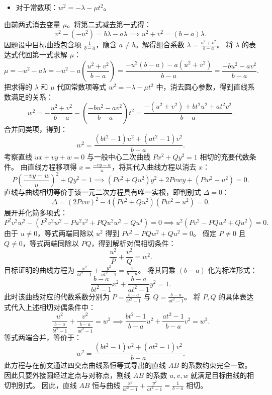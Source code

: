 \begin{solution}
\begin{itemize}
\item 对于常数项：$w^2 = -\lambda - \mu t^2$。
\end{itemize}
由前两式消去变量 $\mu$。将第二式减去第一式得：
\[ v^2 - (-u^2) = b\lambda - a\lambda \implies u^2 + v^2 = (b - a)\lambda. \]
因题设中目标曲线包含项 $\frac{1}{b-a}$，隐含 $a \neq b$。解得组合系数 $\lambda = \frac{u^2 + v^2}{b - a}$。
将 $\lambda$ 的表达式代回第一式求解 $\mu$：
\[ \mu = -u^2 - a\lambda = -u^2 - a\left(\frac{u^2 + v^2}{b - a}\right) = \frac{-u^2(b - a) - a(u^2 + v^2)}{b - a} = \frac{-bu^2 - av^2}{b - a}. \]
把求得的 $\lambda$ 和 $\mu$ 代回常数项等式 $w^2 = -\lambda - \mu t^2$ 中，消去圆心参数，得到直线系数满足的关系：
\[ w^2 = -\frac{u^2 + v^2}{b - a} - \left(\frac{-bu^2 - av^2}{b - a}\right) t^2 = \frac{-(u^2 + v^2) + bt^2 u^2 + at^2 v^2}{b - a}. \]
合并同类项，得到：
\[ w^2 = \frac{(bt^2 - 1)u^2 + (at^2 - 1)v^2}{b - a}. \]
考察直线 $ux + vy + w = 0$ 与一般中心二次曲线 $Px^2 + Qy^2 = 1$ 相切的充要代数条件。
由直线方程移项得 $x = \frac{-vy - w}{u}$，将其代入曲线方程以消去 $x$：
\[ P\left(\frac{-vy - w}{u}\right)^2 + Qy^2 = 1 \implies (Pv^2 + Qu^2)y^2 + 2Pvwy + (Pw^2 - u^2) = 0. \]
直线与曲线相切等价于该一元二次方程具有唯一实根，即判别式 $\Delta = 0$：
\[ \Delta = (2Pvw)^2 - 4(Pv^2 + Qu^2)(Pw^2 - u^2) = 0. \]
展开并化简多项式：
\[ P^2v^2w^2 - (P^2v^2w^2 - Pu^2v^2 + PQu^2w^2 - Qu^4) = 0 \implies u^2(Pv^2 - PQw^2 + Qu^2) = 0. \]
由于 $u \neq 0$，等式两端同除以 $u^2$ 得到 $Pv^2 - PQw^2 + Qu^2 = 0$。
假定 $P \neq 0$ 且 $Q \neq 0$，等式两端同除以 $PQ$，得到解析对偶相切条件：
\[ \frac{u^2}{P} + \frac{v^2}{Q} = w^2. \]
目标证明的曲线方程为 $\frac{x^2}{bt^2 - 1} + \frac{y^2}{at^2 - 1} = \frac{1}{b - a}$。
将其同乘 $(b - a)$ 化为标准形式：
\[ \frac{b - a}{bt^2 - 1} x^2 + \frac{b - a}{at^2 - 1} y^2 = 1. \]
此时该曲线对应的代数系数分别为 $P = \frac{b - a}{bt^2 - 1}$ 与 $Q = \frac{b - a}{at^2 - 1}$。
将 $P, Q$ 的具体表达式代入上述相切对偶条件中：
\[ \frac{u^2}{\frac{b - a}{bt^2 - 1}} + \frac{v^2}{\frac{b - a}{at^2 - 1}} = w^2 \implies \frac{bt^2 - 1}{b - a} u^2 + \frac{at^2 - 1}{b - a} v^2 = w^2. \]
等式两端合并，等价于：
\[ w^2 = \frac{(bt^2 - 1)u^2 + (at^2 - 1)v^2}{b - a}. \]
此方程与在前文通过四交点曲线系恒等式导出的直线 $AB$ 的系数约束完全一致。
因此只要外接圆经过定点与对称点，割线 $AB$ 的系数 $u, v, w$ 就满足目标曲线的相切判别式。
因此，直线 $AB$ 恒与曲线 $\frac{x^2}{bt^2 - 1} + \frac{y^2}{at^2 - 1} = \frac{1}{b - a}$ 相切。
\end{solution}


